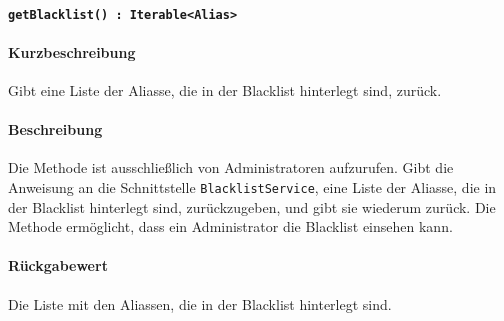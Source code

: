 \paragraph{\texttt{getBlacklist() : Iterable<Alias>}}%
\paragraph*{Kurzbeschreibung}
Gibt eine Liste der Aliasse, die in der Blacklist hinterlegt sind, zurück.
\paragraph*{Beschreibung}
Die Methode ist ausschließlich von Administratoren aufzurufen.
Gibt die Anweisung an die Schnittstelle \texttt{BlacklistService}, eine Liste der Aliasse, die in der Blacklist hinterlegt sind, zurückzugeben, und gibt sie wiederum zurück.
Die Methode ermöglicht, dass ein Administrator die Blacklist einsehen kann.
\paragraph*{Rückgabewert}
Die Liste mit den Aliassen, die in der Blacklist hinterlegt sind.
